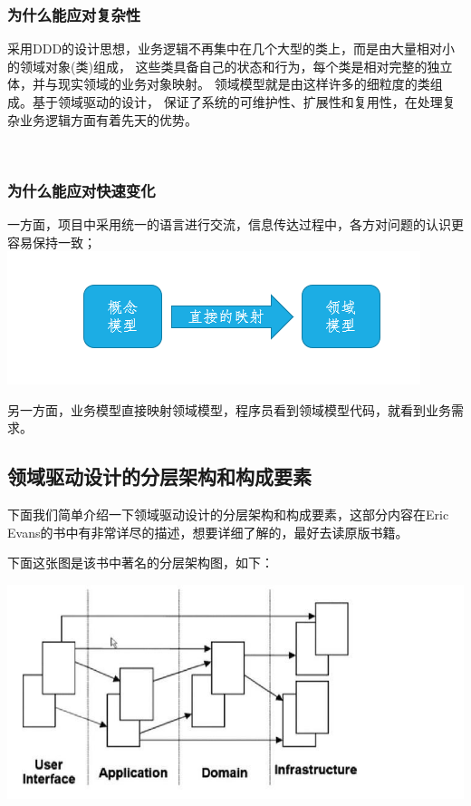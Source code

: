 \documentclass[journal]{IEEEtran}
\begin{document}
\begin{CJK*}{UTF8}{gbsn}
\subsubsection{为什么能应对复杂性}
采用DDD的设计思想，业务逻辑不再集中在几个大型的类上，而是由大量相对小的领域对象(类)组成，
这些类具备自己的状态和行为，每个类是相对完整的独立体，并与现实领域的业务对象映射。
领域模型就是由这样许多的细粒度的类组成。基于领域驱动的设计，
保证了系统的可维护性、扩展性和复用性，在处理复杂业务逻辑方面有着先天的优势。

\\

\subsubsection{为什么能应对快速变化}
一方面，项目中采用统一的语言进行交流，信息传达过程中，各方对问题的认识更容易保持一致；
\includegraphics[scale=0.4]{1.png}

另一方面，业务模型直接映射领域模型，程序员看到领域模型代码，就看到业务需求。

\subsection{领域驱动设计的分层架构和构成要素}


下面我们简单介绍一下领域驱动设计的分层架构和构成要素，这部分内容在Eric Evans的书中有非常详尽的描述，想要详细了解的，最好去读原版书籍。

下面这张图是该书中著名的分层架构图，如下：

\includegraphics[scale=0.4]{3.jpeg}
\\


\end{CJK*}
\end{document}

